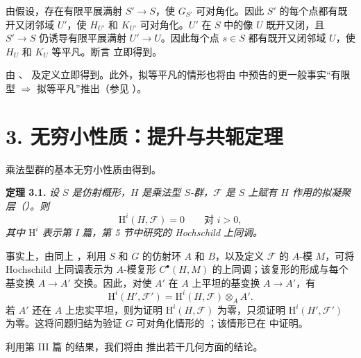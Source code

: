  由假设，存在有限平展满射 \(S'\to S\)，使 \(G_{S'}\) 可对角化。因此 \(S'\) 的每个点都有既开又闭邻域 \(U'\)，使 \(H_{U'}\) 和 \(K_{U'}\) 可对角化。\(U'\) 在 \(S\) 中的像 \(U\) 既开又闭，且 \(S'\to S\) 仍诱导有限平展满射 \(U'\to U\)。因此每个点 \(s\in S\) 都有既开又闭邻域 \(U\)，使 \(H_U\) 和 \(K_U\) 等平凡。断言  立即得到。

 由 、 及定义立即得到。此外，拟等平凡的情形也将由  中预告的更一般事实“有限型 \(\Longrightarrow\) 拟等平凡”推出（参见 ）。

\section*{3. 无穷小性质：提升与共轭定理}

乘法型群的基本无穷小性质由得到。

\medskip
\noindent{}\textbf{定理 3.1.}
\textit{设 \(S\) 是仿射概形，\(H\) 是乘法型 \(S\)-群，\(\mathscr F\) 是 \(S\) 上赋有 \(H\) 作用的拟凝聚层（）。则}
\[
  \mathrm H^i(H,\mathscr F)=0\qquad\text{对 }i>0,
\]
\textit{其中 \(\mathrm H^i\) 表示第 I 篇，第 5 节中研究的 Hochschild 上同调。}

事实上，由同上 ，利用 \(S\) 和 \(G\) 的仿射环 \(A\) 和 \(B\)，以及定义 \(\mathscr F\) 的 \(A\)-模 \(M\)，可将 Hochschild 上同调表示为 \(A\)-模复形 \(C^\bullet(H,M)\) 的上同调；该复形的形成与每个基变换 \(A\to A'\) 交换。因此，对使 \(A'\) 在 \(A\) 上平坦的基变换 \(A\to A'\)，有
\[
  \mathrm H^i(H',\mathscr F')
  =\mathrm H^i(H,\mathscr F)\otimes_AA'.
\]
若 \(A'\) 还在 \(A\) 上忠实平坦，则为证明 \(\mathrm H^i(H,\mathscr F)\) 为零，只须证明 \(\mathrm H^i(H',\mathscr F')\) 为零。这将问题归结为验证 \(G\) 可对角化情形的 ；该情形已在  中证明。

利用第 III 篇 的结果，我们将由  推出若干几何方面的结论。

